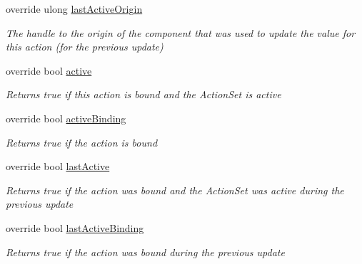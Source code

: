 \begin{DoxyCompactItemize}
override ulong \mbox{\hyperlink{class_valve_1_1_v_r_1_1_steam_v_r___action___boolean___source_ad73216cbbb3caf2c1f42d736e86b7474}{last\+Active\+Origin}}
\begin{DoxyCompactList}\small\item\em The handle to the origin of the component that was used to update the value for this action (for the previous update) \end{DoxyCompactList}\item 
override bool \mbox{\hyperlink{class_valve_1_1_v_r_1_1_steam_v_r___action___boolean___source_ae7f38ff0c9baf560ab3df37206ea19db}{active}}
\begin{DoxyCompactList}\small\item\em Returns true if this action is bound and the Action\+Set is active \end{DoxyCompactList}\item 
override bool \mbox{\hyperlink{class_valve_1_1_v_r_1_1_steam_v_r___action___boolean___source_aa5560617c43d44a46ed2b9bc2740e6a3}{active\+Binding}}
\begin{DoxyCompactList}\small\item\em Returns true if the action is bound \end{DoxyCompactList}\item 
override bool \mbox{\hyperlink{class_valve_1_1_v_r_1_1_steam_v_r___action___boolean___source_a797a1d5c573add8358c04e40de6151e6}{last\+Active}}
\begin{DoxyCompactList}\small\item\em Returns true if the action was bound and the Action\+Set was active during the previous update \end{DoxyCompactList}\item 
override bool \mbox{\hyperlink{class_valve_1_1_v_r_1_1_steam_v_r___action___boolean___source_a818becad695a366d83859d897240c88d}{last\+Active\+Binding}}
\begin{DoxyCompactList}\small\item\em Returns true if the action was bound during the previous update \end{DoxyCompactList}\end{DoxyCompactItemize}
